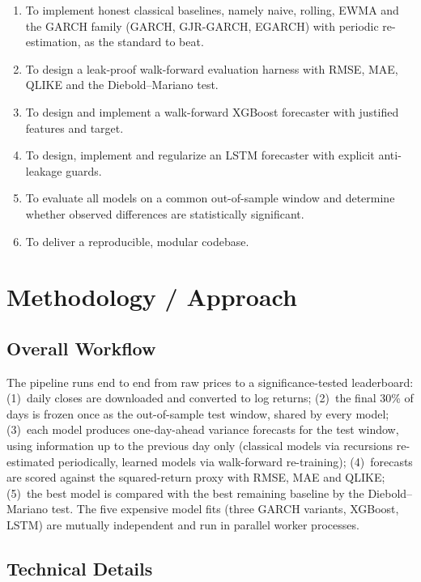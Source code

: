 \documentclass[a4paper,twocolumn,10pt]{article}
\begin{document}
\begin{enumerate}
  \item To implement honest classical baselines, namely naive, rolling, EWMA and the GARCH family (GARCH, GJR-GARCH, EGARCH) with periodic re-estimation, as the standard to beat.
  \item To design a leak-proof walk-forward evaluation harness with RMSE, MAE, QLIKE and the Diebold–Mariano test.
  \item To design and implement a walk-forward XGBoost forecaster with justified features and target.
  \item To design, implement and regularize an LSTM forecaster with explicit anti-leakage guards.
  \item To evaluate all models on a common out-of-sample window and determine whether observed differences are statistically significant.
  \item To deliver a reproducible, modular codebase.
\end{enumerate}

\section{Methodology / Approach}

\subsection{Overall Workflow}

The pipeline runs end to end from raw prices to a significance-tested leaderboard: (1)~daily closes are downloaded and converted to log returns; (2)~the final 30\% of days is frozen once as the out-of-sample test window, shared by every model; (3)~each model produces one-day-ahead variance forecasts for the test window, using information up to the previous day only (classical models via recursions re-estimated periodically, learned models via walk-forward re-training); (4)~forecasts are scored against the squared-return proxy with RMSE, MAE and QLIKE; (5)~the best model is compared with the best remaining baseline by the Diebold–Mariano test. The five expensive model fits (three GARCH variants, XGBoost, LSTM) are mutually independent and run in parallel worker processes.

\subsection{Technical Details}
\end{document}
